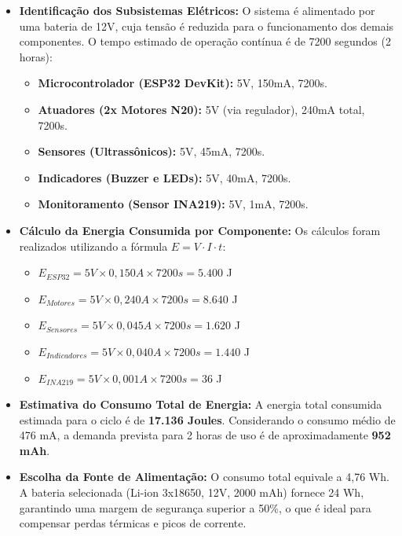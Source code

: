 \begin{itemize}
    \item \textbf{Identificação dos Subsistemas Elétricos:} 
    O sistema é alimentado por uma bateria de 12V, cuja tensão é reduzida para o funcionamento dos demais componentes. O tempo estimado de operação contínua é de 7200 segundos (2 horas):
    \begin{itemize}
        \item \textbf{Microcontrolador (ESP32 DevKit):} 5V, 150mA, 7200s.
        \item \textbf{Atuadores (2x Motores N20):} 5V (via regulador), 240mA total, 7200s.
        \item \textbf{Sensores (Ultrassônicos):} 5V, 45mA, 7200s.
        \item \textbf{Indicadores (Buzzer e LEDs):} 5V, 40mA, 7200s.
        \item \textbf{Monitoramento (Sensor INA219):} 5V, 1mA, 7200s.
    \end{itemize}

    \item \textbf{Cálculo da Energia Consumida por Componente:} 
    Os cálculos foram realizados utilizando a fórmula $E = V \cdot I \cdot t$:
    \begin{itemize}
        \item $E_{ESP32} = 5V \times 0,150A \times 7200s = 5.400$ J
        \item $E_{Motores} = 5V \times 0,240A \times 7200s = 8.640$ J
        \item $E_{Sensores} = 5V \times 0,045A \times 7200s = 1.620$ J
        \item $E_{Indicadores} = 5V \times 0,040A \times 7200s = 1.440$ J
        \item $E_{INA219} = 5V \times 0,001A \times 7200s = 36$ J
    \end{itemize}

    \item \textbf{Estimativa do Consumo Total de Energia:} 
    A energia total consumida estimada para o ciclo é de \textbf{17.136 Joules}. Considerando o consumo médio de 476 mA, a demanda prevista para 2 horas de uso é de aproximadamente \textbf{952 mAh}.

    \item \textbf{Escolha da Fonte de Alimentação:} 
    O consumo total equivale a 4,76 Wh. A bateria selecionada (Li-ion 3x18650, 12V, 2000 mAh) fornece 24 Wh, garantindo uma margem de segurança superior a 50\%, o que é ideal para compensar perdas térmicas e picos de corrente.


\end{itemize}
